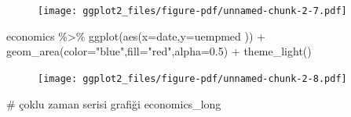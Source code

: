\documentclass[
  letterpaper,
  DIV=11,
  numbers=noendperiod]{scrreprt}
\newenvironment{Shaded}{\begin{snugshade}}{\end{snugshade}}
\newcommand{\AttributeTok}[1]{\textcolor[rgb]{0.40,0.45,0.13}{#1}}
\newcommand{\CommentTok}[1]{\textcolor[rgb]{0.37,0.37,0.37}{#1}}
\newcommand{\DecValTok}[1]{\textcolor[rgb]{0.68,0.00,0.00}{#1}}
\newcommand{\FloatTok}[1]{\textcolor[rgb]{0.68,0.00,0.00}{#1}}
\newcommand{\FunctionTok}[1]{\textcolor[rgb]{0.28,0.35,0.67}{#1}}
\newcommand{\NormalTok}[1]{\textcolor[rgb]{0.00,0.23,0.31}{#1}}
\newcommand{\SpecialCharTok}[1]{\textcolor[rgb]{0.37,0.37,0.37}{#1}}
\newcommand{\StringTok}[1]{\textcolor[rgb]{0.13,0.47,0.30}{#1}}
\begin{document}
\begin{Shaded}
\end{Shaded}

\begin{figure}[H]

{\centering \texttt{[image: ggplot2\_files/figure-pdf/unnamed-chunk-2-7.pdf]}

}

\end{figure}

\begin{Shaded}
\begin{Highlighting}[]
\NormalTok{economics }\SpecialCharTok{\%\textgreater{}\%} 
  \FunctionTok{ggplot}\NormalTok{(}\FunctionTok{aes}\NormalTok{(}\AttributeTok{x=}\NormalTok{date,}\AttributeTok{y=}\NormalTok{uempmed )) }\SpecialCharTok{+}
  \FunctionTok{geom\_area}\NormalTok{(}\AttributeTok{color=}\StringTok{"blue"}\NormalTok{,}\AttributeTok{fill=}\StringTok{"red"}\NormalTok{,}\AttributeTok{alpha=}\FloatTok{0.5}\NormalTok{) }\SpecialCharTok{+}
  \FunctionTok{theme\_light}\NormalTok{()}
\end{Highlighting}
\end{Shaded}

\begin{figure}[H]

{\centering \texttt{[image: ggplot2\_files/figure-pdf/unnamed-chunk-2-8.pdf]}

}

\end{figure}

\begin{Shaded}
\begin{Highlighting}[]
\CommentTok{\# çoklu zaman serisi grafiği}
\NormalTok{economics\_long}
\end{Highlighting}
\end{Shaded}
\end{document}

